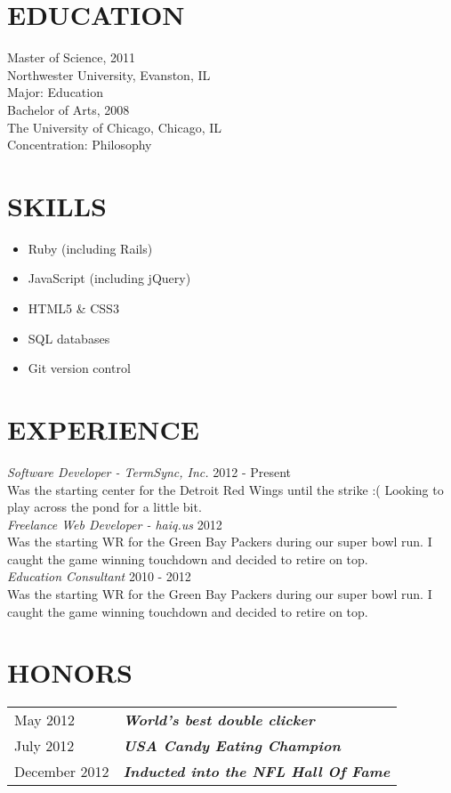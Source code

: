 \documentclass[line, margin]{res}
\begin{document}
\address{1625 Waldorf Blvd. Apt. 302 \\ Madison, WI 53719 \\ (317) 403-5768}
 
\begin{resume}
\section{EDUCATION} 
 Master of Science, 2011 \\
 Northwester University, Evanston, IL \\
 Major: Education \\
 
 Bachelor of Arts, 2008 \\
 The University of Chicago, Chicago, IL \\
 Concentration: Philosophy \\
 
\section{SKILLS}
\begin{itemize}
\item Ruby (including Rails)
\item JavaScript (including jQuery)
\item HTML5 \& CSS3
\item SQL databases
\item Git version control
\end{itemize}
 
\section{EXPERIENCE} 
\textit{Software Developer - TermSync, Inc.} \hfill 2012 - Present \\
Was the starting center for the Detroit Red Wings until the strike :( Looking to play across the pond for a little bit. \\
\textit{Freelance Web Developer - haiq.us} \hfill 2012 \\
Was the starting WR for the Green Bay Packers during our super bowl run. I caught the game winning touchdown and decided to retire on top. \\
\textit{Education Consultant} \hfill 2010 - 2012 \\
Was the starting WR for the Green Bay Packers during our super bowl run. I caught the game winning touchdown and decided to retire on top. \\
 
\section{HONORS}
\begin{tabular}{l l}
May 2012 & \textbf{\textit{World's best double clicker}} \\ [5pt]
July 2012 & \textbf{\textit{USA Candy Eating Champion}} \\ [5pt]
December 2012 & \textbf{\textit{Inducted into the NFL Hall Of Fame}} \\
\end{tabular}
 
\end{resume}
\end{document}
